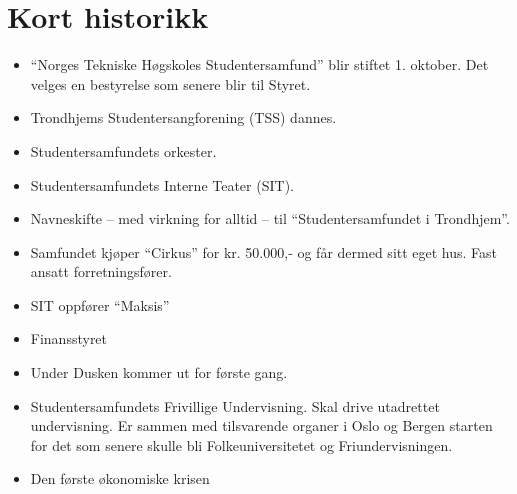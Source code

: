 \chapter*{Kort historikk}


\begin{itemize}
	\item ``Norges Tekniske Høgskoles Studentersamfund'' blir stiftet 1. oktober. Det velges en bestyrelse som senere blir
	til Styret.
	\item Trondhjems Studentersangforening (TSS) dannes.
  \item Studentersamfundets orkester.
  \item Studentersamfundets Interne Teater (SIT).
\end{itemize}


\begin{itemize}
	\item Navneskifte -- med virkning for alltid -- til ``Studentersamfundet i Trondhjem''.
  \item Samfundet kjøper ``Cirkus'' for kr. 50.000,- og får dermed sitt eget hus. Fast ansatt forretningsfører.
\end{itemize}


\begin{itemize}
  \item SIT oppfører ``Maksis''
  \item Finansstyret
\end{itemize}


\begin{itemize}
  \item Under Dusken kommer ut for første gang.
  \item Studentersamfundets Frivillige Undervisning. Skal drive utadrettet undervisning. Er sammen med tilsvarende
organer i Oslo og Bergen starten for det som senere skulle bli Folkeuniversitetet og Friundervisningen.
\end{itemize}


\begin{itemize}
  \item Den første økonomiske krisen
\end{itemize}


